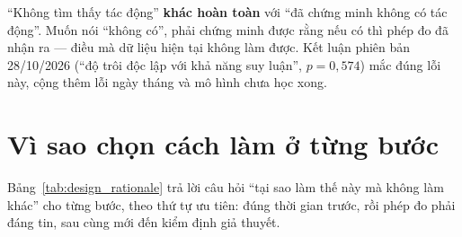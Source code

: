 \begin{remark}
``Không tìm thấy tác động'' \textbf{khác hoàn toàn} với ``đã chứng minh không có tác động''. Muốn nói ``không có'', phải chứng minh được rằng nếu có thì phép đo đã nhận ra --- điều mà dữ liệu hiện tại không làm được. Kết luận phiên bản 28/10/2026 (``độ trôi độc lập với khả năng suy luận'', $p = 0{,}574$) mắc đúng lỗi này, cộng thêm lỗi ngày tháng và mô hình chưa học xong.
\end{remark}

\section{Vì sao chọn cách làm ở từng bước}
\label{sec:design_rationale}
Bảng~\ref{tab:design_rationale} trả lời câu hỏi ``tại sao làm thế này mà không làm khác'' cho từng bước, theo thứ tự ưu tiên: đúng thời gian trước, rồi phép đo phải đáng tin, sau cùng mới đến kiểm định giả thuyết.

